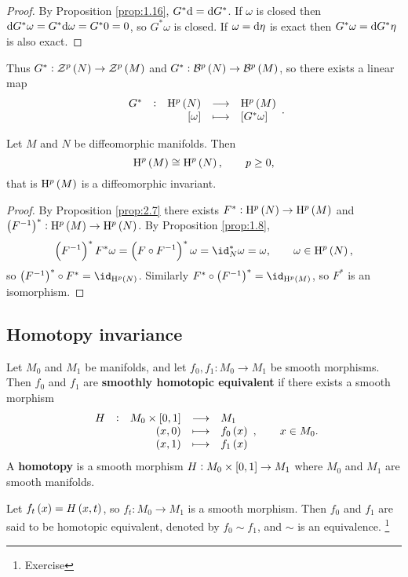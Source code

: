\begin{proof}
By Proposition \ref{prop:1.16}, $ G^*\mathrm{d} = \mathrm{d} G^* $. If $ \omega $ is closed then $ \mathrm{d} G^*\omega = G^*\mathrm{d}\omega = G^*0 = 0 $, so $ G^*\omega $ is closed. If $ \omega = \mathrm{d}\eta $ is exact then $ G^*\omega = \mathrm{d} G^*\eta $ is also exact.
\end{proof}

Thus $ G^* : \ZZZ^p\br{N} \to \ZZZ^p\br{M} $ and $ G^* : \BBB^p\br{N} \to \BBB^p\br{M} $, so there exists a linear map
$$ \function[G^*]{\H^p\br{N}}{\H^p\br{M}}{\sbr{\omega}}{\sbr{G^*\omega}}. $$

\begin{corollary}
Let $ M $ and $ N $ be diffeomorphic manifolds. Then
$$ \H^p\br{M} \cong \H^p\br{N}, \qquad p \ge 0, $$
that is $ \H^p\br{M} $ is a diffeomorphic invariant.
\end{corollary}

\begin{proof}
By Proposition \ref{prop:2.7} there exists $ F^* : \H^p\br{N} \to \H^p\br{M} $ and $ \br{F^{-1}}^* : \H^p\br{M} \to \H^p\br{N} $. By Proposition \ref{prop:1.8},
$$ \br{F^{-1}}^*F^*\omega = \br{F \circ F^{-1}}^*\omega = \id_N^*\omega = \omega, \qquad \omega \in \H^p\br{N}, $$
so $ \br{F^{-1}}^* \circ F^* = \id_{\H^p\br{N}} $. Similarly $ F^* \circ \br{F^{-1}}^* = \id_{\H^p\br{M}} $, so $ F^* $ is an isomorphism.
\end{proof}

\subsection{Homotopy invariance}

\begin{definition}
Let $ M_0 $ and $ M_1 $ be manifolds, and let $ f_0, f_1 : M_0 \to M_1 $ be smooth morphisms. Then $ f_0 $ and $ f_1 $ are \textbf{smoothly homotopic equivalent} if there exists a smooth morphism
$$ \functions[H]{M_0 \times \sbr{0, 1}}{M_1}{\br{x, 0}}{f_0\br{x}}{\br{x, 1}}{f_1\br{x}}, \qquad x \in M_0. $$
A \textbf{homotopy} is a smooth morphism $ H : M_0 \times \sbr{0, 1} \to M_1 $ where $ M_0 $ and $ M_1 $ are smooth manifolds.
\end{definition}


\begin{notation}
Let $ f_t\br{x} = H\br{x, t} $, so $ f_t : M_0 \to M_1 $ is a smooth morphism. Then $ f_0 $ and $ f_1 $ are said to be homotopic equivalent, denoted by $ f_0 \sim f_1 $, and $ \sim $ is an equivalence. \footnote{Exercise}
\end{notation}

